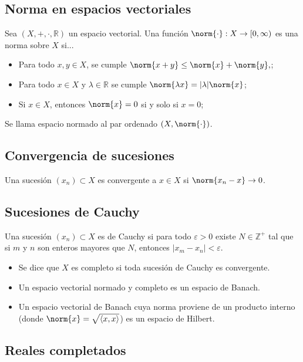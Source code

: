 \documentclass{article}
\begin{document}
\subsection*{Norma en espacios vectoriales}

Sea $(X,+,\cdot,\mathbb{R})$ un espacio vectorial. Una función $\norm{\cdot}:X\to[0,\infty)$ es una norma sobre $X$ si...
\begin{itemize}
\item Para todo $x,y\in X$, se cumple $\norm{x+y}\leq\norm{x}+\norm{y},$;

\item Para todo $x\in X$ y $\lambda\in\mathbb{R}$ se cumple $\norm{\lambda x}=|\lambda|\norm{x}$;

\item Si $x\in X$, entonces $\norm{x}=0$ si y solo si $x=0$;
\end{itemize}
Se llama espacio normado al par ordenado $(X,\norm{\cdot})$.

\subsection*{Convergencia de sucesiones}

Una sucesión $(x_n)\subset X$ es convergente a $x\in X$ si $\norm{x_n-x}\to 0$.

\subsection*{Sucesiones de Cauchy}

Una sucesión $(x_n)\subset X$ es de Cauchy si para todo $\varepsilon>0$ existe $N\in\mathbb{Z}^+$ tal que si $m$ y $n$ son enteros mayores que $N$, entonces $|x_m-x_n|<\varepsilon$.

\begin{itemize}
\item Se dice que $X$ es completo si toda sucesión de Cauchy es convergente.

\item Un espacio vectorial normado y completo es un espacio de Banach.

\item Un espacio vectorial de Banach cuya norma proviene de un producto interno (donde $\norm{x}=\sqrt{\langle x,x\rangle}$) es un espacio de Hilbert.
\end{itemize}

\subsection*{Reales completados}
\end{document}
